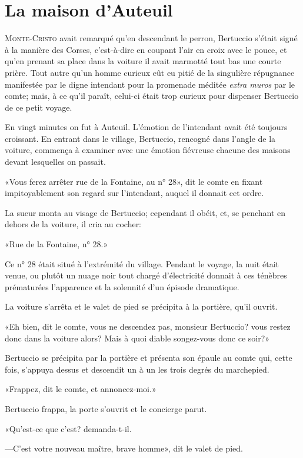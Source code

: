 \chapter{La maison d'Auteuil}

\lettrine{M}{onte-Cristo} avait remarqué qu'en descendant le perron, Bertuccio s'était signé à la manière des Corses, c'est-à-dire en coupant l'air en croix avec le pouce, et qu'en prenant sa place dans la voiture il avait marmotté tout bas une courte prière. Tout autre qu'un homme curieux eût eu pitié de la singulière répugnance manifestée par le digne intendant pour la promenade méditée \textit{extra muros} par le comte; mais, à ce qu'il paraît, celui-ci était trop curieux pour dispenser Bertuccio de ce petit voyage. 

En vingt minutes on fut à Auteuil. L'émotion de l'intendant avait été toujours croissant. En entrant dans le village, Bertuccio, rencogné dans l'angle de la voiture, commença à examiner avec une émotion fiévreuse chacune des maisons devant lesquelles on passait. 

«Vous ferez arrêter rue de la Fontaine, au n° 28», dit le comte en fixant impitoyablement son regard sur l'intendant, auquel il donnait cet ordre. 

La sueur monta au visage de Bertuccio; cependant il obéit, et, se penchant en dehors de la voiture, il cria au cocher:  

«Rue de la Fontaine, n° 28.» 

Ce n° 28 était situé à l'extrémité du village. Pendant le voyage, la nuit était venue, ou plutôt un nuage noir tout chargé d'électricité donnait à ces ténèbres prématurées l'apparence et la solennité d'un épisode dramatique. 

La voiture s'arrêta et le valet de pied se précipita à la portière, qu'il ouvrit. 

«Eh bien, dit le comte, vous ne descendez pas, monsieur Bertuccio? vous restez donc dans la voiture alors? Mais à quoi diable songez-vous donc ce soir?» 

Bertuccio se précipita par la portière et présenta son épaule au comte qui, cette fois, s'appuya dessus et descendit un à un les trois degrés du marchepied. 

«Frappez, dit le comte, et annoncez-moi.» 

Bertuccio frappa, la porte s'ouvrit et le concierge parut. 

«Qu'est-ce que c'est? demanda-t-il. 

—C'est votre nouveau maître, brave homme», dit le valet de pied. 

